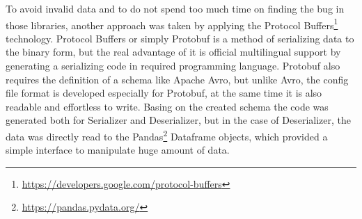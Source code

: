 To avoid invalid data and to do not spend too much time on finding the bug in those libraries, another approach was taken by applying the Protocol Buffers\footnote{\url{https://developers.google.com/protocol-buffers}} technology.
Protocol Buffers or simply Protobuf is a method of serializing data to the binary form, but the real advantage of it is official multilingual support by generating a serializing code in required programming language.
Protobuf also requires the definition of a schema like Apache Avro, but unlike Avro, the config file format is developed especially for Protobuf, at the same time it is also readable and effortless to write.
Basing on the created schema the code was generated both for Serializer and Deserializer, but in the case of Deserializer, the data was directly read to the Pandas\footnote{\url{https://pandas.pydata.org/}} Dataframe objects, which provided a simple interface to manipulate huge amount of data.
